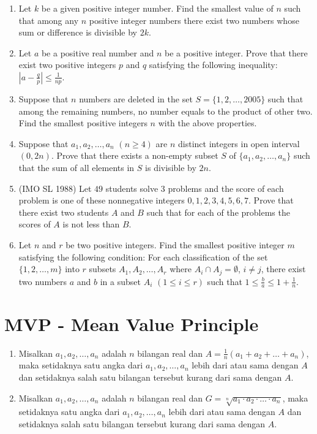 \documentclass[12pt]{scrartcl}
\begin{document}
\begin{enumerate}
    \item Let $k$ be a given positive integer number. Find the smallest value of $n$ such that among any $n$ positive integer numbers there exist two numbers whose sum or difference is divisible by $2k$.
    
    \item Let $a$ be a positive real number and $n$ be a positive integer. Prove that there exist two positive integers $p$ and $q$ satisfying the following inequality: $\left|a-\frac{q}{p}\right| \le \frac{1}{np}$.
    
    \item Suppose that $n$ numbers are deleted in the set $S = \{1 ,2, \dots , 2005 \}$ such that among the remaining numbers, no number equals to the product of other two. Find the smallest positive integers $n$ with the above properties.
    
    \item Suppose that $a_1, a_2, \dots, a_n$ $(n \ge 4)$ are $n$ distinct integers in open interval $(0, 2n)$. Prove that there exists a non-empty subset $S$ of $\{a_1, a_2, \dots, a_n\}$ such that the sum of all elements in $S$ is divisible by $2n$.
    
    \item (IMO SL 1988) Let $49$ students solve $3$ problems and the score of each problem is one of these nonnegative integers $0, 1, 2, 3, 4, 5, 6, 7$. Prove that there exist two students $A$ and $B$ such that for each of the problems the scores of $A$ is not less than $B$.
    
    \item Let $n$ and $r$ be two positive integers. Find the smallest positive integer $m$ satisfying the following condition: For each classification of the set $\{1, 2, \dots, m \}$ into $r$ subsets $A_1, A_2, \dots, A_r$ where $A_i \cap A_j = \emptyset$, $i \neq j$, there exist two numbers $a$ and $b$ in a subset $A_i$ $(1 \le i \le r)$ such that $1 \le \frac{b}{a} \le 1 + \frac{1}{n}$.
\end{enumerate}

\section{MVP - Mean Value Principle}
\begin{definition}
    \begin{enumerate}
        \item Misalkan $a_1, a_2, \dots, a_n$ adalah $n$ bilangan real dan $A = \frac{1}{n}(a_1+a_2+\dots+a_n)$, maka setidaknya satu angka dari $a_1,a_2,\dots,a_n$ lebih dari atau sama dengan $A$ dan setidaknya salah satu bilangan tersebut kurang dari sama dengan $A$.
        
        \item  Misalkan $a_1, a_2, \dots, a_n$ adalah $n$ bilangan real dan $G = \sqrt[n]{a_1\cdot a_2\cdot\dots\cdot a_n}$, maka setidaknya satu angka dari $a_1,a_2,\dots,a_n$ lebih dari atau sama dengan $A$ dan setidaknya salah satu bilangan tersebut kurang dari sama dengan $A$.
    \end{enumerate}
\end{definition}
\end{document}
